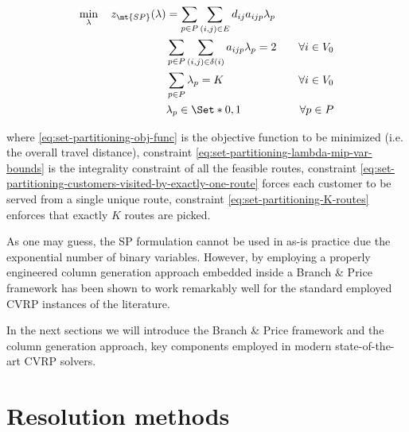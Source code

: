 \begin{align}
	\min_{\lambda} \quad z_\mt{SP}(\lambda) & = \sum_{p \in P} \sum_{(i, j) \in E} d_{ij} a_{ijp} \lambda_p \label{eq:set-partitioning-obj-func}                                                                                                                                           \\
	                                        & \sum_{p \in P} \sum_{(i, j) \in \delta(i)} a_{ijp} \lambda_p = 2                                   & \quad \forall i \in V_0                                              \label{eq:set-partitioning-customers-visited-by-exactly-one-route} \\
	                                        & \sum_{p \in P} \lambda_{p} = K                                                                     & \quad \forall i \in V_0                                              \label{eq:set-partitioning-K-routes}                               \\
	                                        & \lambda_p                    \in \Set*{0, 1}                                                       & \quad \forall p \in P \label{eq:set-partitioning-lambda-mip-var-bounds}
\end{align}

where \eqref{eq:set-partitioning-obj-func} is the objective function to be minimized (i.e. the overall travel distance),
constraint \eqref{eq:set-partitioning-lambda-mip-var-bounds} is the integrality constraint of all the feasible routes,
constraint \eqref{eq:set-partitioning-customers-visited-by-exactly-one-route} forces each customer to be served from a single unique route,
constraint \eqref{eq:set-partitioning-K-routes} enforces that exactly $K$ routes are picked.

As one may guess, the SP formulation cannot be used in as-is practice due the exponential number of binary variables.
However, by employing a properly engineered column generation approach embedded inside a Branch \& Price framework has
been shown to work remarkably well for the standard employed CVRP instances of the literature.

In the next sections we will introduce the Branch \& Price framework and the column generation approach, key components employed in modern state-of-the-art CVRP solvers.

\section{Resolution methods}

